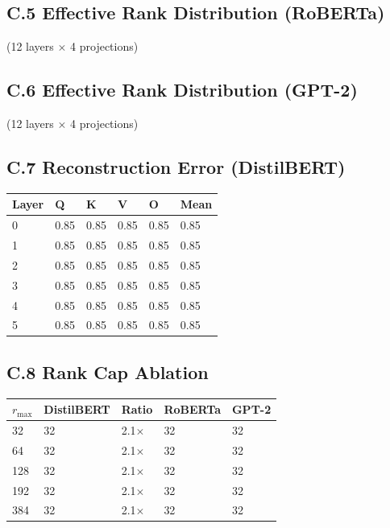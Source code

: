 \subsection{C.5 Effective Rank Distribution (RoBERTa)}

(12 layers $\times$ 4 projections)

\subsection{C.6 Effective Rank Distribution (GPT-2)}

(12 layers $\times$ 4 projections)

\subsection{C.7 Reconstruction Error (DistilBERT)}

\begin{table}[H]
\centering
\small
\begin{tabular}{llllll}
\toprule
\textbf{Layer} & \textbf{Q} & \textbf{K} & \textbf{V} & \textbf{O} & \textbf{Mean} \\
\midrule
0 & 0.85 & 0.85 & 0.85 & 0.85 & 0.85 \\
1 & 0.85 & 0.85 & 0.85 & 0.85 & 0.85 \\
2 & 0.85 & 0.85 & 0.85 & 0.85 & 0.85 \\
3 & 0.85 & 0.85 & 0.85 & 0.85 & 0.85 \\
4 & 0.85 & 0.85 & 0.85 & 0.85 & 0.85 \\
5 & 0.85 & 0.85 & 0.85 & 0.85 & 0.85 \\
\bottomrule
\end{tabular}
\end{table}

\subsection{C.8 Rank Cap Ablation}

\begin{table}[H]
\centering
\small
\begin{tabular}{lllll}
\toprule
\textbf{$r_\text{max}$} & \textbf{DistilBERT} & \textbf{Ratio} & \textbf{RoBERTa} & \textbf{GPT-2} \\
\midrule
32 & 32 & 2.1$\times$ & 32 & 32 \\
64 & 32 & 2.1$\times$ & 32 & 32 \\
128 & 32 & 2.1$\times$ & 32 & 32 \\
192 & 32 & 2.1$\times$ & 32 & 32 \\
384 & 32 & 2.1$\times$ & 32 & 32 \\
\bottomrule
\end{tabular}
\end{table}

